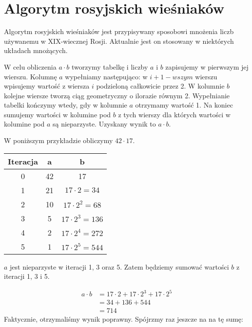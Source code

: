 \section{Algorytm rosyjskich wieśniaków}



Algorytm rosyjskich wieśniaków jest przypisywany sposobowi mnożenia liczb używanemu w XIX-wiecznej Rosji.
Aktualnie jest on stosowany w niektórych układach mnożących.

W celu obliczenia $a \cdot b$ tworzymy tabelkę i liczby $a$ i $b$ zapisujemy w pierwszym jej wierszu.
Kolumnę $a$ wypełniamy następująco: w $i+1-wszym$ wierszu wpisujemy wartość z wiersza $i$ podzieloną całkowicie przez 2.
W kolumnie $b$ kolejne wiersze tworzą ciąg geometryczny o ilorazie równym 2.
Wypełnianie tabelki kończymy wtedy, gdy w kolumnie $a$ otrzymamy wartość 1.
Na koniec sumujemy wartości w kolumine pod $b$ z tych wierszy dla których wartości w kolumine pod $a$ są nieparzyste.
Uzyskany wynik to $a \cdot b$.


W poniższym przykładzie obliczymy $42 \cdot 17$.

\begin{center}
\begin{tabular}{ |c|c|c| } 
 \hline
 Iteracja & a & b \\ 
 \hline
 0 & 42 & 17 \\ 
 1 & 21 & $17 \cdot 2 = 34$ \\
 2 & 10 & $17 \cdot 2^2 = 68$ \\
 3 & 5  & $17 \cdot 2^3 = 136$ \\
 4 & 2  & $17 \cdot 2^4 = 272$ \\
 5 & 1  & $17 \cdot 2^5 = 544$ \\
 
 \hline
\end{tabular}
\end{center}

$a$ jest nieparzyste w iteracji 1, 3 oraz 5. Zatem będziemy sumować wartości $b$ z iteracji 1, 3 i 5.

\begin{equation*} 
\begin{split}
a \cdot b &= 17\cdot2 + 17\cdot2^3 + 17\cdot2^5 \\
&= 34 + 136 + 544 \\
&= 714
\end{split}
\end{equation*}
Faktycznie, otrzymaliśmy wynik poprawny. Spójrzmy raz jeszcze na na tę sumę:

